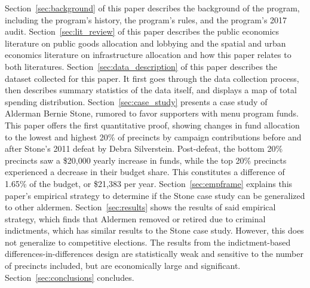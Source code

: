 Section~\ref{sec:background} of this paper describes the background of the program, including the program's history, the program's rules, and the program's 2017 audit.
Section~\ref{sec:lit_review} of this paper describes the public economics literature on public goods allocation and lobbying and the spatial and urban economics literature on infrastructure allocation and how this paper relates to both literatures.
Section~\ref{sec:data_description} of this paper describes the dataset collected for this paper. 
It first goes through the data collection process, then describes summary statistics of the data itself, and displays a map of total spending distribution.
Section~\ref{sec:case_study} presents a case study of Alderman Bernie Stone, rumored to favor supporters with menu program funds. 
This paper offers the first quantitative proof, showing changes in fund allocation to the lowest and highest 20\% of precincts by campaign contributions before and after Stone's 2011 defeat by Debra Silverstein. 
Post-defeat, the bottom 20\% precincts saw a \$20,000 yearly increase in funds, while the top 20\% precincts experienced a decrease in their budget share.
This constitutes a difference of 1.65\% of the budget, or \$21,383 per year.
Section~\ref{sec:empframe} explains this paper's empirical strategy to determine if the Stone case study can be generalized to other aldermen.
Section~\ref{sec:results} shows the results of said empirical strategy, which finds that Aldermen removed or retired due to criminal indictments, which has similar results to the Stone case study. 
However, this does not generalize to competitive elections.
The results from the indictment-based differences-in-differences design are statistically weak and sensitive to the number of precincts included, but are economically large and significant.
Section~\ref{sec:conclusions} concludes.

